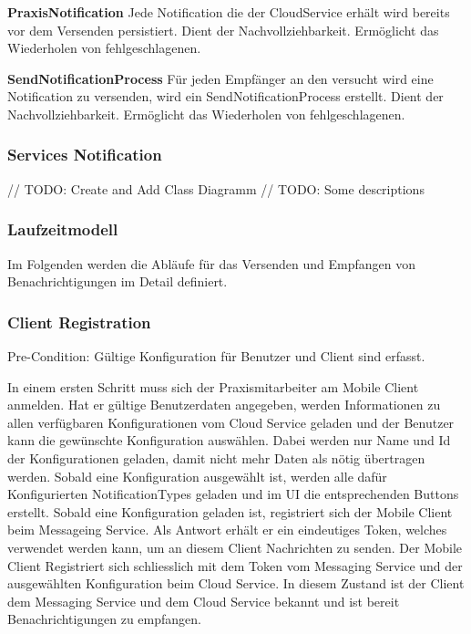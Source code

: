 \textbf{PraxisNotification}
Jede Notification die der CloudService erhält wird bereits vor dem Versenden persistiert.
Dient der Nachvollziehbarkeit.
Ermöglicht das Wiederholen von fehlgeschlagenen.

\textbf{SendNotificationProcess}
Für jeden Empfänger an den versucht wird eine Notification zu versenden, wird ein SendNotificationProcess erstellt.
Dient der Nachvollziehbarkeit.
Ermöglicht das Wiederholen von fehlgeschlagenen.

\subsubsection*{Services Notification}

// TODO: Create and Add Class Diagramm
// TODO: Some descriptions




\clearpage

\clearpage
\subsubsection{Laufzeitmodell}

Im Folgenden werden die Abläufe für das Versenden und Empfangen von Benachrichtigungen im Detail definiert.

\subsubsection*{Client Registration}

Pre-Condition: Gültige Konfiguration für Benutzer und Client sind erfasst.

In einem ersten Schritt muss sich der Praxismitarbeiter am Mobile Client anmelden.
Hat er gültige Benutzerdaten angegeben, werden Informationen zu allen verfügbaren Konfigurationen vom Cloud Service geladen und der Benutzer kann die gewünschte Konfiguration auswählen.
Dabei werden nur Name und Id der Konfigurationen geladen, damit nicht mehr Daten als nötig übertragen werden.
Sobald eine Konfiguration ausgewählt ist, werden alle dafür Konfigurierten NotificationTypes geladen und im UI die entsprechenden Buttons erstellt.
Sobald eine Konfiguration geladen ist, registriert sich der Mobile Client beim Messageing Service.
Als Antwort erhält er ein eindeutiges Token, welches verwendet werden kann, um an diesem Client Nachrichten zu senden.
Der Mobile Client Registriert sich schliesslich mit dem Token vom Messaging Service und der ausgewählten Konfiguration beim Cloud Service.
In diesem Zustand ist der Client dem Messaging Service und dem Cloud Service bekannt und ist bereit Benachrichtigungen zu empfangen.

